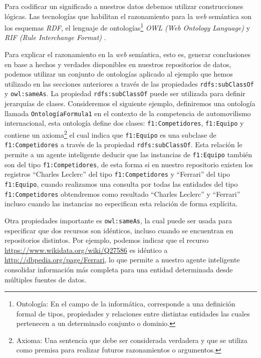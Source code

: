 Para codificar un significado a nuestros datos debemos utilizar construcciones
lógicas. Las tecnologías que habilitan el razonamiento para la \textit{web}
semántica son los esquemas \textit{RDF}, el lenguaje de
ontologías\footnote{Ontología: En el campo de la informática, corresponde a una
definición formal de tipos, propiedades y relaciones entre distintas entidades
las cuales pertenecen a un determinado conjunto o dominio.} \textit{OWL (Web
Ontology Language)} \cite{antoniou2004web} y \textit{RIF (Rule Interchange
Format)} \cite{kifer2008rule}.

Para explicar el razonamiento en la \textit{web} semántica, esto es, generar
conclusiones en base a hechos y verdades disponibles en nuestros repositorios de
datos, podemos utilizar un conjunto de ontologías aplicado al ejemplo que hemos
utilizado en las secciones anteriores a través de las propiedades
\texttt{rdfs:subClassOf} y \texttt{owl:sameAs}. La propiedad
\texttt{rdfs:subClassOf} puede ser utilizada para definir jerarquías de clases.
Consideremos el siguiente ejemplo, definiremos una ontología llamada
\texttt{OntologíaFormula1} en el contexto de la competencia de automovilismo
internacional, esta ontología define dos clases: \texttt{f1:Competidores},
\texttt{f1:Equipo} y contiene un axioma\footnote{Axioma: Una sentencia que debe
ser considerada verdadera y que se utiliza como premisa para realizar futuros
razonamientos o argumentos.} el cual indica que \texttt{f1:Equipo} es una
subclase de \texttt{f1:Competidores} a través de la propiedad
\texttt{rdfs:subClassOf}. Esta relación le permite a un agente inteligente
deducir que las instancias de \texttt{f1:Equipo} también son del tipo
\texttt{f1:Competidores}, de esta forma si en nuestro repositorio existen los
registros ``Charles Leclerc'' del tipo \texttt{f1:Competidores} y ``Ferrari''
del tipo \texttt{f1:Equipo}, cuando realizamos una consulta por todas las
entidades del tipo \texttt{f1:Competidores} obtendremos como resultado ``Charles
Leclerc'' y ``Ferrari'' incluso cuando las instancias no especifican esta
relación de forma explícita.

Otra propiedades importante es \texttt{owl:sameAs}, la cual puede ser usada para
especificar que dos recursos son idénticos, incluso cuando se encuentran en
repositorios distintos. Por ejemplo, podemos indicar que el recurso
\url{https://www.wikidata.org/wiki/Q27586} es idéntico a
\url{http://dbpedia.org/page/Ferrari}, lo que permite a nuestro agente
inteligente consolidar información más completa para una entidad determinada
desde múltiples fuentes de datos.

